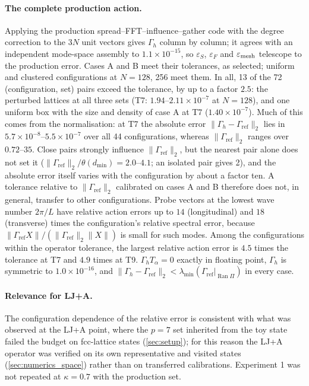 \documentclass[11pt]{article}
\DeclareRobustCommand{\_}{\textunderscore\allowbreak}
\theoremstyle{remark}
\theoremstyle{definition}
\newcommand{\Gref}{\Gamma_{\mathrm{ref}}}
\newcommand{\Gh}{\Gamma_h}
\newcommand{\Ran}{\operatorname{Ran}}
\begin{document}
\paragraph{The complete production action.}
Applying the production spread--FFT--influence--gather code with the degree correction to the $3N$ unit vectors gives $\Gh$ column by
column; it agrees with an independent mode-space assembly to $1.1\times10^{-15}$, so $\varepsilon_S$, $\varepsilon_F$ and
$\varepsilon_{\rm mesh}$ telescope to the production error. Cases A and B meet their tolerances, as selected; uniform and clustered
configurations at $N=128$, 256 meet them. In all, 13 of the 72 (configuration, set) pairs exceed the tolerance, by up to a factor
$2.5$: the perturbed lattices at all three sets (T7: $1.94$--$2.11\times10^{-7}$ at $N=128$), and one uniform box with the size and
density of case A at T7 ($1.40\times10^{-7}$). Much of this comes from the normalisation: at T7 the absolute error $\|\Gh-\Gref\|_2$
lies in $5.7\times10^{-8}$--$5.5\times10^{-7}$ over all 44 configurations, whereas $\|\Gref\|_2$ ranges over $0.72$--$35$. Close pairs
strongly influence $\|\Gref\|_2$, but the nearest pair alone does not set it ($\|\Gref\|_2/\theta(d_{\min})=2.0$--$4.1$; an isolated pair
gives 2), and the absolute error itself varies with the configuration by about a factor ten. A tolerance relative to $\|\Gref\|_2$
calibrated on cases A and B therefore does not, in general, transfer to other configurations. Probe vectors at the lowest wave number $2\pi/L$ have relative action errors up to $14$ (longitudinal) and $18$
(transverse) times the configuration's relative spectral error, because $\|\Gref X\|/(\|\Gref\|_2\|X\|)$ is small for such modes. Among the configurations within the operator tolerance, the
largest relative action error is $4.5$ times the tolerance at T7 and $4.9$ times at T9.
$\Gh T_\alpha=0$ exactly in floating point, $\Gh$ is symmetric to $1.0\times10^{-16}$, and $\|\Gh-\Gref\|_2<\lambda_{\min}(\Gref|_{\Ran\Pi})$ in
every case.

\paragraph{Relevance for LJ+A.}
The configuration dependence of the relative error is consistent with what was observed at the LJ+A point, where the $p=7$ set inherited
from the toy state failed the budget on fcc-lattice states (\cref{sec:setup}); for this reason the LJ+A operator was verified on its own
representative and visited states (\cref{sec:numerics_space}) rather than on transferred calibrations. Experiment 1 was not repeated at
$\kappa=0.7$ with the production set.
\end{document}
